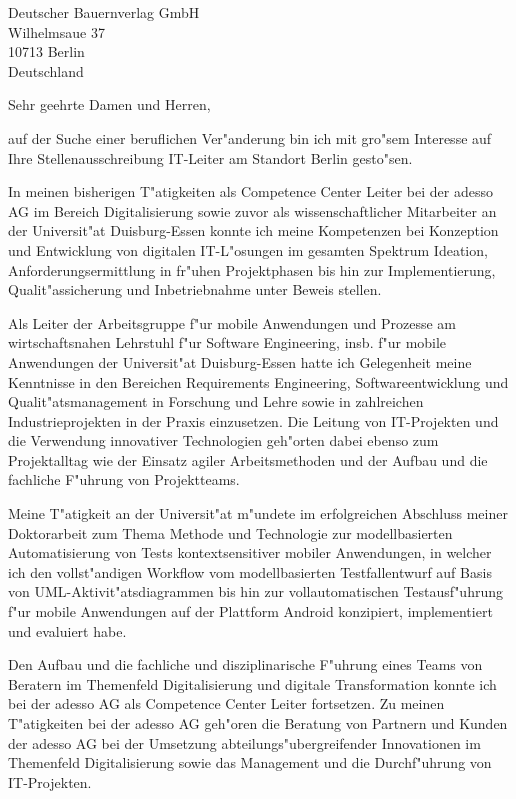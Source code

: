 \documentclass[10pt,a4paper]{dinbrief}
\date{\today}
\begin{document}
 
\begin{letter}  
{%
	Deutscher Bauernverlag GmbH\\
	Wilhelmsaue 37\\
	10713 Berlin\\
	Deutschland
}
\subject{\bf Bewerbung IT-Leiter}
\opening{Sehr geehrte Damen und Herren,}
auf der Suche einer beruflichen Ver"anderung bin ich mit gro"sem Interesse auf Ihre Stellenausschreibung IT-Leiter am Standort Berlin gesto"sen. 

In meinen bisherigen T"atigkeiten als Competence Center Leiter bei der adesso AG im Bereich Digitalisierung sowie zuvor als wissenschaftlicher Mitarbeiter an der Universit"at Duisburg-Essen konnte ich meine Kompetenzen bei Konzeption und Entwicklung von digitalen IT-L"osungen im gesamten Spektrum Ideation, Anforderungsermittlung in fr"uhen Projektphasen bis hin zur Implementierung, Qualit"assicherung und Inbetriebnahme unter Beweis stellen.

Als Leiter der Arbeitsgruppe f"ur mobile Anwendungen und Prozesse am wirtschaftsnahen Lehrstuhl f"ur Software Engineering, insb. f"ur mobile Anwendungen der Universit"at Duisburg-Essen hatte ich Gelegenheit meine Kenntnisse in den Bereichen Requirements Engineering, Softwareentwicklung und Qualit"atsmanagement in Forschung und Lehre sowie in zahlreichen Industrieprojekten in der Praxis einzusetzen. Die Leitung von IT-Projekten und die Verwendung innovativer Technologien geh"orten dabei ebenso zum Projektalltag wie der Einsatz agiler Arbeitsmethoden und der Aufbau und die fachliche  F"uhrung von Projektteams.

Meine T"atigkeit an der Universit"at m"undete im erfolgreichen Abschluss meiner Doktor\-arbeit zum Thema Methode und Technologie zur modellbasierten Automatisierung von Tests kontextsensitiver mobiler Anwendungen, in welcher ich den vollst"andigen Workflow vom modellbasierten Testfallentwurf auf Basis von UML-Aktivit"atsdiagrammen bis hin zur vollautomatischen Testausf"uhrung f"ur mobile Anwendungen auf der Plattform Android konzipiert, implementiert und evaluiert habe.

\clearpage
Den Aufbau und die fachliche und disziplinarische F"uhrung eines Teams von Beratern im Themenfeld Digitalisierung und digitale Transformation konnte ich bei der adesso AG als Competence Center Leiter fortsetzen. Zu meinen T"atigkeiten bei der adesso AG geh"oren die Beratung von Partnern und Kunden der adesso AG bei der Umsetzung abteilungs"ubergreifender Innovationen im Themenfeld Digitalisierung sowie das Management und die Durchf"uhrung von IT-Projekten.


\end{letter}
\end{document}
